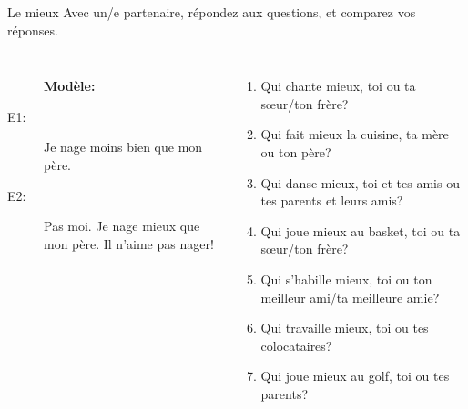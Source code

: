 \documentclass{beamer}
\begin{document}
  \begin{frame}{Le mieux}
    Avec un/e partenaire, répondez aux questions, et comparez vos réponses. \\
    \begin{columns}
      \scriptsize
        \begin{description}
          \item[] \textbf{Modèle:}
          \item[] 
          \item[E1:] Je nage moins bien que mon père.
          \item[E2:] Pas moi. Je nage mieux que mon père. Il n'aime pas nager!
        \end{description}
        \begin{enumerate}
          \item Qui chante mieux, toi ou ta sœur/ton frère?
          \item Qui fait mieux la cuisine, ta mère ou ton père?
          \item Qui danse mieux, toi et tes amis ou tes parents et leurs amis?
          \item Qui joue mieux au basket, toi ou ta sœur/ton frère?
          \item Qui s'habille mieux, toi ou ton meilleur ami/ta meilleure amie?
          \item Qui travaille mieux, toi ou tes colocataires?
          \item Qui joue mieux au golf, toi ou tes parents?
        \end{enumerate}
    \end{columns}
  \end{frame}
\end{document}
